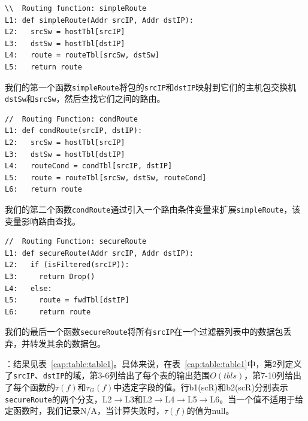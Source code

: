 \documentclass{ctexart}
\newcommand{\para}[1]{\smallskip\noindent {\bf #1}}
\begin{document}
{\small
\begin{verbatim}
\\  Routing function: simpleRoute
L1: def simpleRoute(Addr srcIP, Addr dstIP):
L2:   srcSw = hostTbl[srcIP]
L3:   dstSw = hostTbl[dstIP]
L4:   route = routeTbl[srcSw, dstSw]
L5:   return route
\end{verbatim}
}

我们的第一个函数\texttt{simpleRoute}将包的\texttt{srcIP}和\texttt{dstIP}映射到它们的主机包交换机\texttt{dstSw}和\texttt{srcSw}，然后查找它们之间的路由。



{\small
\begin{verbatim}
//  Routing Function: condRoute
L1: def condRoute(srcIP, dstIP):
L2:   srcSw = hostTbl[srcIP]
L3:   dstSw = hostTbl[dstIP]
L4:   routeCond = condTbl[srcIP, dstIP]
L5:   route = routeTbl[srcSw, dstSw, routeCond]
L6:   return route
\end{verbatim}
}
我们的第二个函数\texttt{condRoute}通过引入一个路由条件变量来扩展\texttt{simpleRoute}，该变量影响路由查找。


{\small
\begin{verbatim}
//  Routing Function: secureRoute
L1: def secureRoute(Addr srcIP, Addr dstIP):
L2:   if (isFiltered(srcIP)):
L3:     return Drop()
L4:   else:
L5:     route = fwdTbl[dstIP]
L6:     return route
\end{verbatim}
}
我们的最后一个函数\texttt{secureRoute}将所有\texttt{srcIP}在一个过滤器列表中的数据包丢弃，并转发其余的数据包。


\para{结果}：结果见表~\ref{cap:table:table1}。具体来说，在表~\ref{cap:table:table1}中，第2列定义了\texttt{srcIP}、\texttt{dstIP}的域，第3-6列给出了每个表的输出范围$O(tbls)$，第7-10列给出了每个函数的$\tau(f)$和$\tau_G(f)$中选定字段的值。行b1(scR)和b2(scR)分别表示\texttt{secureRoute}的两个分支，L2$\to$L3和L2$\to$L4$\to$L5$\to$L6。当一个值不适用于给定函数时，我们记录N/A，当计算失败时，$\tau(f)$的值为null。

\end{document}
